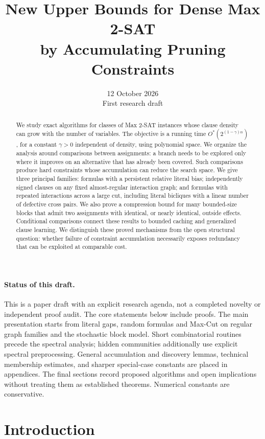 \documentclass[11pt,a4paper]{article}
\title{New Upper Bounds for Dense Max 2-SAT\\[3pt]
by Accumulating Pruning Constraints}
\author{}
\date{12 October 2026\\\small First research draft}
\theoremstyle{definition}
\theoremstyle{remark}
\newcommand{\Ostar}{O^{*}}
\begin{document}
\maketitle

\begin{abstract}
We study exact algorithms for classes of Max 2-SAT instances whose clause
density can grow with the number of variables. The objective is a running
time $\Ostar(2^{(1-\gamma)n})$, for a constant $\gamma>0$ independent of
density, using polynomial space. We organize the analysis around comparisons
between assignments: a branch needs to be explored only where it improves
on an alternative that has already been covered. Such comparisons produce
hard constraints whose accumulation can reduce the search space.
We give three principal families: formulas with a persistent relative literal
bias; independently signed clauses on any fixed almost-regular interaction
graph; and formulas with repeated interactions across a large cut, including
literal bicliques with a linear number of defective cross pairs. We also
prove a compression bound for many bounded-size blocks that admit two
assignments with identical, or nearly identical, outside effects.
Conditional comparisons connect these results to bounded caching and
generalized clause learning. We distinguish these proved mechanisms from
the open structural question: whether failure of constraint accumulation
necessarily exposes redundancy that can be exploited at comparable cost.
\end{abstract}

\paragraph{Status of this draft.}
This is a paper draft with an explicit research agenda, not a completed
novelty or independent proof audit. The core statements below include proofs.
The main presentation starts from literal gaps, random formulas and
Max-Cut on regular graph families and the stochastic block model.
Short combinatorial routines precede the spectral analysis; hidden
communities additionally use explicit spectral preprocessing. General
accumulation and discovery lemmas, technical membership estimates, and
sharper special-case constants are placed in appendices. The final sections record proposed algorithms and open
implications without treating them as established theorems. Numerical
constants are conservative.

\section{Introduction}
\end{document}
